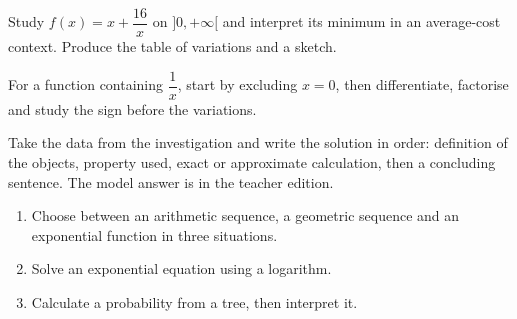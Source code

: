 \begin{activite}
Study $f(x)=x+\dfrac{16}{x}$ on $]0,+\infty[$ and interpret its minimum in an average-cost context. Produce the table of variations and a sketch.
\begin{center}\end{center}
\end{activite}

\begin{traceecrite}For a function containing $\dfrac1x$, start by excluding $x=0$, then differentiate, factorise and study the sign before the variations.\end{traceecrite}

\begin{exemple}
Take the data from the investigation and write the solution in order: definition of the objects, property used, exact or approximate calculation, then a concluding sentence. The model answer is in the teacher edition.
\end{exemple}

\begin{exercice}[-- essentiel]
\begin{enumerate}\item Choose between an arithmetic sequence, a geometric sequence and an exponential function in three situations.\item Solve an exponential equation using a logarithm.\item Calculate a probability from a tree, then interpret it.\end{enumerate}
\end{exercice}


